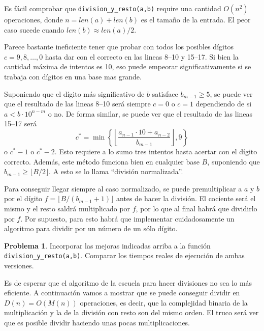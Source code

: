 \documentclass[a4paper, 11pt]{article}
\newcounter{numerodetema}
\theoremstyle{plain}
\theoremstyle{definition}
\newtheorem{prob}{Problema}[numerodetema]
\begin{document}
\bigskip

Es fácil comprobar que \texttt{division\_y\_resto(a,b)} require una cantidad
$O(n^2)$ operaciones, donde $n=len(a)+len(b)$ es el tamaño de la entrada. El
peor caso sucede cuando $len(b)\approx len(a)/2$.

\bigskip

Parece bastante ineficiente tener que probar con todos los posibles
dígitos $c=9,8,\ldots,0$ hasta dar con el correcto en las lineas 8--10 y
15--17. Si bien la cantidad máxima de intentos es 10, eso puede empeorar
significativamente si se trabaja con dígitos en una base mas grande.

\bigskip

Suponiendo que el dígito más significativo de $b$ satisface $b_{m-1}\geq 5$,
se puede ver que el resultado de las lineas 8--10 será siempre $c=0$ o $c=1$
dependiendo de si $a<b\cdot 10^{n-m}$ o no. De forma similar, se puede
ver que el resultado de las lineas 15--17 será
\[
   c^*=\min\left\{
     \left\lfloor\frac{a_{n-1}\cdot 10+a_{n-2}}{b_{m-1}}\right\rfloor,9
     \right\}
\]
o $c^*-1$ o $c^*-2$. Esto requiere a lo sumo tres intentos hasta
acertar con el dígito correcto. Además, este método funciona bien en
cualquier base $B$, suponiendo que $b_{m-1}\geq\lfloor B/2\rfloor$.
A esto se lo llama ``división normalizada''.

\bigskip

Para conseguir llegar siempre al caso normalizado, se puede premultiplicar
a $a$ y $b$ por el dígito $f=\lfloor B/(b_{m-1}+1)\rfloor$ antes de hacer
la división. El cociente será el mismo y el resto saldrá multiplicado por $f$,
por lo que al final habrá que dividirlo por $f$. Por supuesto, para esto
habrá que implementar cuidadosamente un algoritmo para dividir por un
número de un sólo dígito.

\begin{prob}
Incorporar las mejoras indicadas arriba a la función
\texttt{division\_y\_resto(a,b)}. Comparar los tiempos reales de ejecución de
ambas versiones.
\end{prob}

Es de esperar que el algoritmo de la escuela para hacer divisiones no sea
lo más eficiente. A continuación vamos a mostrar que se puede conseguir
dividir en $D(n)=O(M(n))$ operaciones, es decir, que la complejidad binaria
de la multiplicación y la de la división con resto son del mismo orden. El
truco será ver que es posible dividir haciendo unas pocas multiplicaciones.

\bigskip
\end{document}
